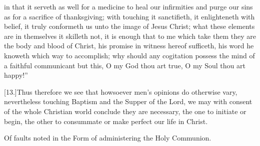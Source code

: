  in that it serveth as well for a medicine to heal our infirmities and purge our sins as for a sacrifice of thanksgiving; with touching it sanctifieth, it enlighteneth with belief, it truly conformeth us unto the image of Jesus Christ; what these elements are in themselves it skilleth not, it is enough that to me which take them they are the body and blood of Christ, his promise in witness hereof sufficeth, his word he knoweth which way to accomplish; why should any cogitation possess the mind of a faithful communicant but this, O my God thou art true, O my Soul thou art happy!”

[13.]Thus therefore we see that howsoever men’s opinions do otherwise vary, nevertheless touching Baptism and the Supper of the Lord, we may with consent of the whole Christian world conclude they are necessary, the one to initiate or begin, the other to consummate or make perfect our life in Christ.


Of faults noted in the Form of administering the Holy Communion.
